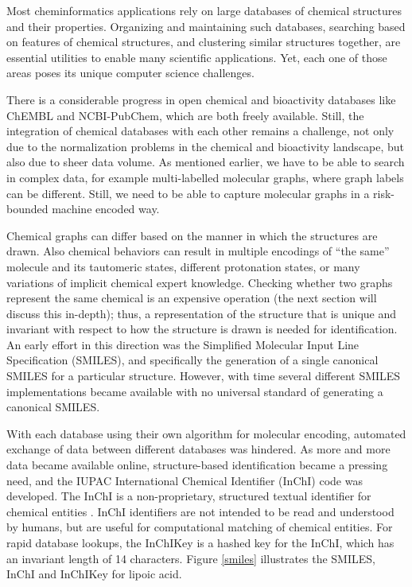 \documentclass{sig-alternate}
\begin{document}
Most cheminformatics applications rely on large databases of chemical structures
and their properties. Organizing and maintaining such databases, searching based
on features of chemical structures, and clustering similar structures together,
are essential utilities to enable many scientific applications. Yet, each one of
those areas poses its unique computer science challenges.

There is a considerable progress in open chemical and bioactivity databases like
ChEMBL and NCBI-PubChem, which are both freely available. Still, the integration
of chemical databases with each other remains a challenge, not only due to the
normalization problems in the chemical and bioactivity landscape, but also due
to sheer data volume. As mentioned earlier, we have to be able to
search in complex data, for example multi-labelled molecular graphs, where
graph labels can be different. Still, we need to be able to capture
molecular graphs in a risk-bounded machine encoded way.

Chemical graphs can differ based on the manner in which the structures
are drawn. Also chemical behaviors can result in multiple encodings of
``the same'' molecule and its tautomeric states, different protonation
states, or many variations of implicit chemical expert
knowledge. Checking whether two graphs represent the same chemical is
an expensive operation (the next section will discuss this in-depth);
thus, a representation of the structure that is unique and invariant
with respect to how the structure is drawn is needed for
identification. An early effort in this direction was the Simplified
Molecular Input Line Specification (SMILES), and specifically the
generation of a single canonical SMILES for a particular structure. However,
with time several
different SMILES implementations became available with no universal
standard of generating a canonical SMILES. 

With each database using their own algorithm for molecular encoding,
automated exchange of data between different databases was hindered. 
As more and more data became available online,
structure-based identification became a pressing need, and the IUPAC
International Chemical Identifier (InChI) code was developed. The
InChI is a non-proprietary, structured textual identifier for chemical
entities \cite{inchi}. InChI identifiers are not intended to be read and
understood by humans, but are useful for computational matching of
chemical entities. For rapid database lookups, the InChIKey is a
hashed key for the InChI, which has an invariant length of 14
characters. Figure \ref{smiles} illustrates the SMILES, InChI and InChIKey for
lipoic acid.
\end{document}
